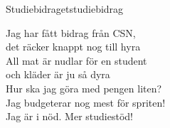 \begin{song}{Studiebidraget}{studiebidrag}
    \begin{vers}
    Jag har fått bidrag från CSN,\\
    det räcker knappt nog till hyra\\
    All mat är nudlar för en student\\
    och kläder är ju så dyra\\
    Hur ska jag göra med pengen liten?\\
    Jag budgeterar nog mest för spriten!\\
    Jag är i nöd. Mer studiestöd!\\
    \end{vers}
    \end{song}
    